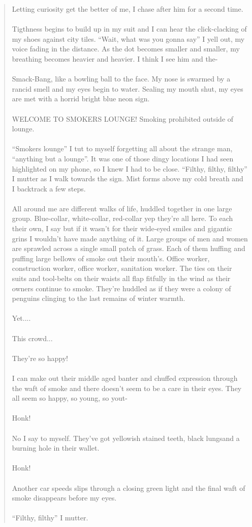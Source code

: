 \documentclass{book}
\begin{document}
\begin{quote}
{{Letting curiosity get the better of me, I chase after him for a second time.\\\\Tigthness begins to build up in my suit and I can hear the click-clacking of my shoes against city tiles. ``Wait, what was you gonna say'' I yell out, my voice fading in the distance. As the dot becomes smaller and smaller, my breathing becomes heavier and heavier. I think I see him and the-\\\\Smack-Bang, like a bowling ball to the face. My nose is swarmed by a rancid smell and my eyes begin to water. Sealing my mouth shut, my eyes are met with a horrid bright blue neon sign.\\\\WELCOME TO SMOKERS LOUNGE! Smoking prohibited outside of lounge.\\\\``Smokers lounge'' I tut to myself forgetting all about the strange man, ``anything but a lounge''. It was one of those dingy locations I had seen highlighted on my phone, so I knew I had to be close. ``Filthy, filthy, filthy'' I mutter as I walk towards the sign. Mist forms above my cold breath and I backtrack a few steps.\\\\All around me are different walks of life, huddled together in one large group. Blue-collar, white-collar, red-collar yep they're all here. To each their own, I say but if it wasn't for their wide-eyed smiles and gigantic grins I wouldn't have made anything of it. Large groups of men and women are sprawled across a single small patch of grass. Each of them huffing and puffing large bellows of smoke out their mouth's. Office worker, construction worker, office worker, sanitation worker. The ties on their suits and tool-belts on their waists all flap fitfully in the wind as their owners continue to smoke. They're huddled as if they were a colony of penguins clinging to the last remains of winter warmth.\\\\Yet....\\\\This crowd...\\\\ They're so happy!\\\\I can make out their middle aged banter and chuffed expression through the waft of smoke and there doesn't seem to be a care in their eyes. They all seem so happy, so young, so yout-\\\\Honk!\\\\No I say to myself. They've got yellowish stained teeth, black lungsand a burning hole in their wallet.\\\\Honk!\\\\ Another car speeds slips through a closing green light and the final waft of smoke disappears before my eyes.\\\\``Filthy, filthy'' I mutter.}}



\end{quote}
\end{document}
